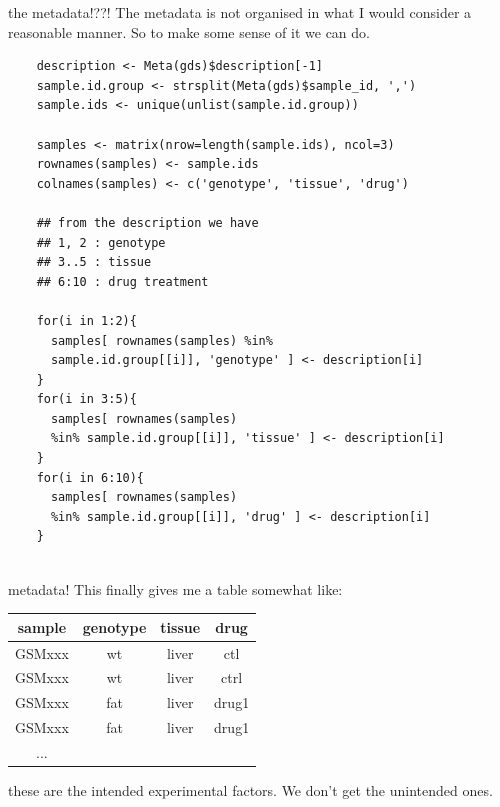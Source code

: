 \documentclass[pdf]{beamer}
\begin{document}
\begin{frame}[fragile]{the metadata!??!}
  The metadata is not organised in what I
  would consider a reasonable manner. So to
  make some sense of it we can do.

  \begin{verbatim}
    description <- Meta(gds)$description[-1]
    sample.id.group <- strsplit(Meta(gds)$sample_id, ',')
    sample.ids <- unique(unlist(sample.id.group))
    
    samples <- matrix(nrow=length(sample.ids), ncol=3)
    rownames(samples) <- sample.ids
    colnames(samples) <- c('genotype', 'tissue', 'drug')

    ## from the description we have
    ## 1, 2 : genotype
    ## 3..5 : tissue
    ## 6:10 : drug treatment

    for(i in 1:2){
      samples[ rownames(samples) %in% 
      sample.id.group[[i]], 'genotype' ] <- description[i]
    }
    for(i in 3:5){
      samples[ rownames(samples) 
      %in% sample.id.group[[i]], 'tissue' ] <- description[i]
    }
    for(i in 6:10){
      samples[ rownames(samples) 
      %in% sample.id.group[[i]], 'drug' ] <- description[i]
    }
    
  \end{verbatim}
\end{frame}

\begin{frame}{metadata!}
  This finally gives me a table somewhat like:
  
  {\footnotesize
  \begin{tabular}{c|ccc} \footnotesize
    sample & genotype & tissue & drug \\
    \hline
    GSMxxx & wt & liver & ctl \\
    GSMxxx & wt & liver & ctrl \\
    GSMxxx & fat & liver & drug1 \\
    GSMxxx & fat & liver & drug1 \\
    ... & & &
  \end{tabular}
  }

  these are the intended experimental factors. We don't
  get the unintended ones.
\end{frame}
\end{document}
